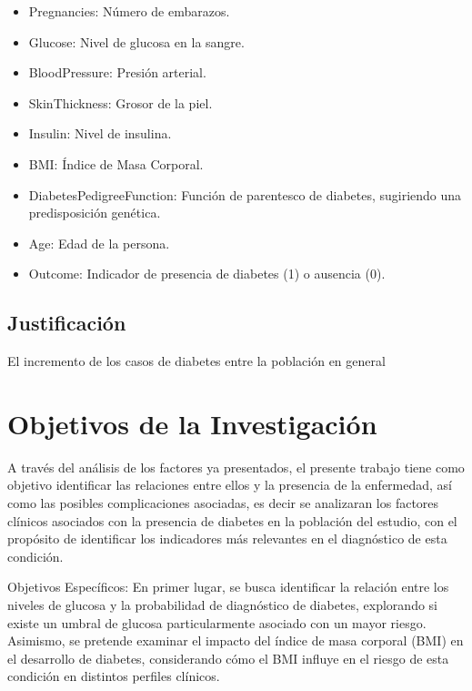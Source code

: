 \documentclass[12pt, oneside openany]{apa7}
\begin{document}
\begin{itemize}
    \item Pregnancies: Número de embarazos.
    \item Glucose: Nivel de glucosa en la sangre.
    \item BloodPressure: Presión arterial.
    \item SkinThickness: Grosor de la piel.
    \item Insulin: Nivel de insulina.
    \item BMI: Índice de Masa Corporal.
    \item DiabetesPedigreeFunction: Función de parentesco de diabetes, sugiriendo una predisposición genética.
    \item Age: Edad de la persona.
    \item Outcome: Indicador de presencia de diabetes (1) o ausencia (0).
\end{itemize}










\subsection{Justificación}
El incremento de los casos de diabetes entre la población en general

\section{Objetivos de la Investigación}

A través del análisis de los factores ya presentados, el presente trabajo tiene como objetivo identificar las relaciones entre ellos y la presencia de la enfermedad, así como las posibles complicaciones asociadas, es decir se analizaran los factores clínicos asociados con la presencia de diabetes en la población del estudio, con el propósito de identificar los indicadores más relevantes en el diagnóstico de esta condición.

Objetivos Específicos:
En primer lugar, se busca identificar la relación entre los niveles de glucosa y la probabilidad de diagnóstico de diabetes, explorando si existe un umbral de glucosa particularmente asociado con un mayor riesgo. Asimismo, se pretende examinar el impacto del índice de masa corporal (BMI) en el desarrollo de diabetes, considerando cómo el BMI influye en el riesgo de esta condición en distintos perfiles clínicos.
\end{document}
